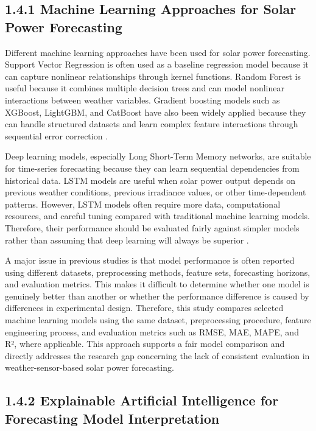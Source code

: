 \subsection{1.4.1 Machine Learning Approaches for Solar Power Forecasting}

Different machine learning approaches have been used for solar power forecasting. Support Vector Regression is often used as a baseline regression model because it can capture nonlinear relationships through kernel functions. Random Forest is useful because it combines multiple decision trees and can model nonlinear interactions between weather variables. Gradient boosting models such as XGBoost, LightGBM, and CatBoost have also been widely applied because they can handle structured datasets and learn complex feature interactions through sequential error correction \parencite{JnanaVarshitha2025, Bakht2025, Alhassan2025}.

Deep learning models, especially Long Short-Term Memory networks, are suitable for time-series forecasting because they can learn sequential dependencies from historical data. LSTM models are useful when solar power output depends on previous weather conditions, previous irradiance values, or other time-dependent patterns. However, LSTM models often require more data, computational resources, and careful tuning compared with traditional machine learning models. Therefore, their performance should be evaluated fairly against simpler models rather than assuming that deep learning will always be superior \parencite{Eren2025, TsaiLo2025, Duvuru2026}.

A major issue in previous studies is that model performance is often reported using different datasets, preprocessing methods, feature sets, forecasting horizons, and evaluation metrics. This makes it difficult to determine whether one model is genuinely better than another or whether the performance difference is caused by differences in experimental design. Therefore, this study compares selected machine learning models using the same dataset, preprocessing procedure, feature engineering process, and evaluation metrics such as RMSE, MAE, MAPE, and R², where applicable. This approach supports a fair model comparison and directly addresses the research gap concerning the lack of consistent evaluation in weather-sensor-based solar power forecasting.

\subsection{1.4.2 Explainable Artificial Intelligence for Forecasting Model Interpretation}

